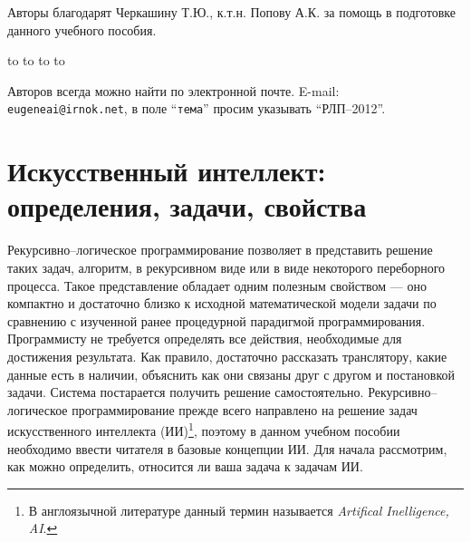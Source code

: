 \documentclass[12pt, openany, twoside]{book} %
\begin{document}
Авторы благодарят Черкашину  Т.Ю., к.т.н. Попову А.К. за помощь в подготовке данного учебного пособия.

\medskip
\noindent\hbox to \linewidth{\hfill\sf С.н.с. ИДСТУ СО РАН, доцента кафедр ВТ ИрГТУ и ИТ ИМЭИ ИГУ}
\noindent\hbox to \linewidth{\hfill\sf к.т.н. Е.А.Черкашин}
\noindent\hbox to \linewidth{\hfill\sf аспирант кафедры ИТ ИМЭИ ИГУ}
\noindent\hbox to \linewidth{\hfill\sf И.Н.Терехин}

\vfill
\makeatletter
{} Авторов всегда можно найти по электронной почте. E-mail:\\
{\tt eugeneai@irnok.net}, в поле ``{\tt тема}'' просим указывать ``РЛП--2012''.
\makeatother

\chapter{Искусственный интеллект: определения, задачи, свойства}

Рекурсивно--логическое программирование позволяет в представить решение таких задач, алгоритм, в рекурсивном виде или в виде некоторого переборного процесса. Такое представление обладает одним полезным свойством --- оно компактно и достаточно близко к исходной математической модели задачи по сравнению с изученной ранее процедурной парадигмой программирования. Программисту не требуется определять все действия, необходимые для достижения результата. Как правило, достаточно рассказать транслятору, какие данные есть в наличии, объяснить как они связаны друг с другом и постановкой задачи. Система постарается получить решение самостоятельно. Рекурсивно--логическое программирование прежде всего направлено на решение задач искусственного интеллекта (ИИ)\footnote{В англоязычной литературе данный термин называется \emph{Artifical Inelligence, AI}. }, поэтому в данном учебном пособии необходимо ввести читателя в базовые концепции ИИ. Для начала рассмотрим, как можно определить, относится ли ваша задача к задачам ИИ.
\end{document}
